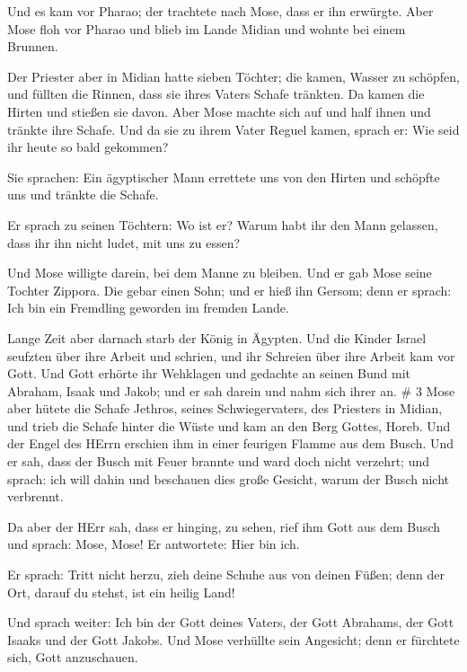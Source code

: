  Und es kam vor Pharao; der trachtete nach Mose, dass er
ihn erwürgte. Aber Mose floh vor Pharao und blieb im Lande Midian und
wohnte bei einem Brunnen.

 Der Priester aber in Midian hatte sieben Töchter; die
kamen, Wasser zu schöpfen, und füllten die Rinnen, dass sie ihres Vaters
Schafe tränkten.  Da kamen die Hirten und stießen sie
davon. Aber Mose machte sich auf und half ihnen und tränkte ihre Schafe.
 Und da sie zu ihrem Vater Reguel kamen, sprach er: Wie
seid ihr heute so bald gekommen?

 Sie sprachen: Ein ägyptischer Mann errettete uns von den
Hirten und schöpfte uns und tränkte die Schafe.

 Er sprach zu seinen Töchtern: Wo ist er? Warum habt ihr
den Mann gelassen, dass ihr ihn nicht ludet, mit uns zu essen?

 Und Mose willigte darein, bei dem Manne zu bleiben. Und er
gab Mose seine Tochter Zippora.  Die gebar einen Sohn; und
er hieß ihn Gersom; denn er sprach: Ich bin ein Fremdling geworden im
fremden Lande.

 Lange Zeit aber darnach starb der König in Ägypten. Und
die Kinder Israel seufzten über ihre Arbeit und schrien, und ihr
Schreien über ihre Arbeit kam vor Gott.  Und Gott erhörte
ihr Wehklagen und gedachte an seinen Bund mit Abraham, Isaak und Jakob;
 und er sah darein und nahm sich ihrer an. \# 3
 Mose aber hütete die Schafe Jethros, seines
Schwiegervaters, des Priesters in Midian, und trieb die Schafe hinter
die Wüste und kam an den Berg Gottes, Horeb.  Und der Engel
des HErrn erschien ihm in einer feurigen Flamme aus dem Busch. Und er
sah, dass der Busch mit Feuer brannte und ward doch nicht verzehrt;
 und sprach: ich will dahin und beschauen dies große
Gesicht, warum der Busch nicht verbrennt.

 Da aber der HErr sah, dass er hinging, zu sehen, rief ihm
Gott aus dem Busch und sprach: Mose, Mose! Er antwortete: Hier bin ich.

 Er sprach: Tritt nicht herzu, zieh deine Schuhe aus von
deinen Füßen; denn der Ort, darauf du stehst, ist ein heilig Land!

 Und sprach weiter: Ich bin der Gott deines Vaters, der Gott
Abrahams, der Gott Isaaks und der Gott Jakobs. Und Mose verhüllte sein
Angesicht; denn er fürchtete sich, Gott anzuschauen.

